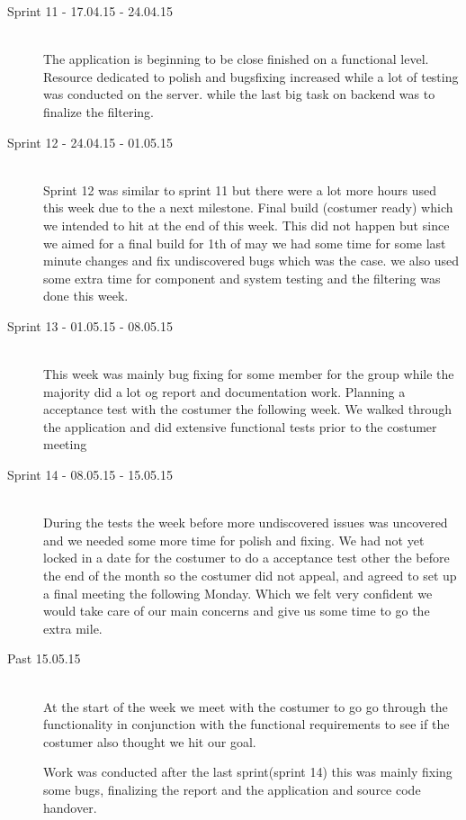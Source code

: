 \begin{description}
	\item[Sprint 11 - 17.04.15 - 24.04.15] \hfill \\ 
	The application is beginning to be close finished on a functional level. Resource dedicated to polish and bugsfixing increased while a lot of testing was conducted on the server. while the last big task on backend was to finalize the filtering.

	\item[Sprint 12 - 24.04.15 - 01.05.15] \hfill \\ 
	Sprint 12 was similar to sprint 11 but there were a lot more hours used this week due to the a next milestone. Final build (costumer ready) which we intended to hit at the end of this week. This did not happen but since we aimed for a final build for 1th of may we had some time for some last minute changes and fix undiscovered bugs which was the case. we also used some extra time for component and system testing and the filtering was done this week.
	
	\item[Sprint 13 - 01.05.15 - 08.05.15] \hfill \\ 
	This week was mainly bug fixing for some member for the group while the majority did a lot og report and documentation work. Planning a acceptance test with the costumer the following week. We walked through the application and did extensive functional tests prior to the costumer meeting 

	\item[Sprint 14 - 08.05.15 - 15.05.15] \hfill \\ 
	During the tests the week before more undiscovered issues was uncovered and we needed some more time for polish and fixing. We had not yet locked in a date for the costumer to do a acceptance test other the before the end of the month so the costumer did not appeal, and agreed to set up a final meeting the following Monday. Which we felt very confident we would take care of our main concerns and give us some time to go the extra mile.
	
	\item[Past 15.05.15] \hfill \\ 
	At the start of the week we meet with the costumer to go go through the functionality in conjunction with the functional requirements to see if the costumer also thought we hit our goal.
	  
	Work was conducted after the last sprint(sprint 14) this was mainly fixing some bugs, finalizing the report and the application and source code handover.
	
\end{description}

